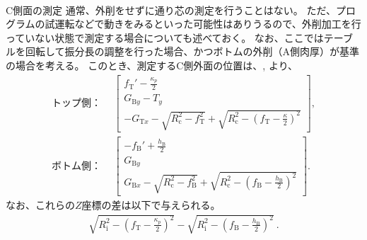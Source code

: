 \clearpage
~\vfill
\begin{Column}{C側面の測定}
通常、外削をせずに通り芯の測定を行うことはない。
ただ、プログラムの試運転などで動きをみるといった可能性はありうるので、外削加工を行っていない状態で測定する場合についても述べておく。
なお、ここではテーブルを回転して振分長の調整を行った場合、かつボトムの外削（A側肉厚）が基準の場合を考える。
このとき、測定するC側外面の位置は、, より、
\begin{align*}
  \text{トップ側：}~~
  & \left[
    \begin{array}{c}
      \displaystyle f_\mathrm T'-\frac{\kappa_p}2\\[5pt]
      G_{\mathrm By}-T_y\\[3pt]
      \displaystyle
      -G_{\mathrm Tx}
      -\sqrt{R_\mathrm c^2-f_\mathrm T^2}
      +\sqrt{R_\mathrm c^2-\left(f_\mathrm T-\frac\kappa2\right)^2}
    \end{array}
    \right],\\
  \text{ボトム側：}~~
  & \left[
    \begin{array}{c}
      \displaystyle -f_\mathrm B'+\frac{h_\mathrm B}2\\[5pt]
      G_{\mathrm By}\\[3pt]
      \displaystyle
      G_{\mathrm Bx}
      -\sqrt{R_\mathrm c^2-f_\mathrm B^2}
      +\sqrt{R_\mathrm c^2-\left(f_\mathrm B-\frac{h_\mathrm B}2\right)^2}
    \end{array}
    \right].
\end{align*}
なお、これらの$Z$座標の差は以下で与えられる。
\begin{align*}
  \sqrt{R_\mathrm i^2-\left(f_\mathrm T-\frac{\kappa_p}2\right)^2}
  -\sqrt{R_\mathrm i^2-\left(f_\mathrm B-\frac{h_\mathrm B}2\right)^2}~.
\end{align*}
\end{Column}
